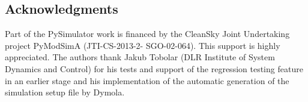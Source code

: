 \subsection*{Acknowledgments}
\label{sec:pythonacknowledgments}

Part of the PySimulator work is financed by the CleanSky Joint Undertaking project PyModSimA (JTI-CS-2013-2-
SGO-02-064). This support is highly appreciated. The authors thank Jakub Tobolar (DLR
Institute of System Dynamics and Control) for his tests and support of the regression testing feature in an
earlier stage and his implementation of the automatic generation of the simulation setup file by Dymola.




